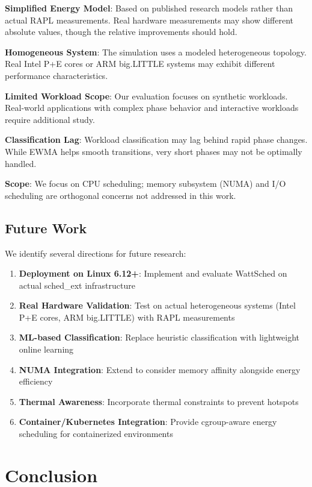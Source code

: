\documentclass{article}
\begin{document}
\textbf{Simplified Energy Model}: Based on published research models rather than actual RAPL measurements. Real hardware measurements may show different absolute values, though the relative improvements should hold.

\textbf{Homogeneous System}: The simulation uses a modeled heterogeneous topology. Real Intel P+E cores or ARM big.LITTLE systems may exhibit different performance characteristics.

\textbf{Limited Workload Scope}: Our evaluation focuses on synthetic workloads. Real-world applications with complex phase behavior and interactive workloads require additional study.

\textbf{Classification Lag}: Workload classification may lag behind rapid phase changes. While EWMA helps smooth transitions, very short phases may not be optimally handled.

\textbf{Scope}: We focus on CPU scheduling; memory subsystem (NUMA) and I/O scheduling are orthogonal concerns not addressed in this work.

\subsection{Future Work}

We identify several directions for future research:
\begin{enumerate}
    \item \textbf{Deployment on Linux 6.12+}: Implement and evaluate WattSched on actual sched\_ext infrastructure
    \item \textbf{Real Hardware Validation}: Test on actual heterogeneous systems (Intel P+E cores, ARM big.LITTLE) with RAPL measurements
    \item \textbf{ML-based Classification}: Replace heuristic classification with lightweight online learning
    \item \textbf{NUMA Integration}: Extend to consider memory affinity alongside energy efficiency
    \item \textbf{Thermal Awareness}: Incorporate thermal constraints to prevent hotspots
    \item \textbf{Container/Kubernetes Integration}: Provide cgroup-aware energy scheduling for containerized environments
\end{enumerate}

\section{Conclusion}
\label{sec:conclusion}
\end{document}
